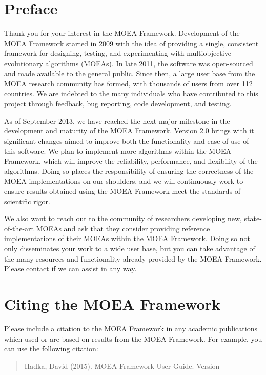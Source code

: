 %
%

\chapter*{Preface}

Thank you for your interest in the MOEA Framework.  Development of the MOEA Framework started in 2009 with the idea of providing a single, consistent framework for designing, testing, and experimenting with multiobjective evolutionary algorithms (MOEAs).  In late 2011, the software was open-sourced and made available to the general public.  Since then, a large user base from the MOEA research community has formed, with thousands of users from over 112 countries.  We are indebted to the many individuals who have contributed to this project through feedback, bug reporting, code development, and testing.

As of September 2013, we have reached the next major milestone in the development and maturity of the MOEA Framework.  Version 2.0 brings with it significant changes aimed to improve both the functionality and ease-of-use of this software.  We plan to implement more algorithms within the MOEA Framework, which will improve the reliability, performance, and flexibility of the algorithms.  Doing so places the responsibility of ensuring the correctness of the MOEA implementations on our shoulders, and we will continuously work to ensure results obtained using the MOEA Framework meet the standards of scientific rigor.

We also want to reach out to the community of researchers developing new, state-of-the-art MOEAs and ask that they consider providing reference implementations of their MOEAs within the MOEA Framework.  Doing so not only disseminates your work to a wide user base, but you can take advantage of the many resources and functionality already provided by the MOEA Framework.  Please contact  if we can assist in any way.

\chapter*{Citing the MOEA Framework}

Please include a citation to the MOEA Framework in any academic publications which used or are based on results from the MOEA Framework.  For example, you can use the following citation:

\begin{quote}
  Hadka, David (2015).  MOEA Framework User Guide. Version %
\end{quote}
